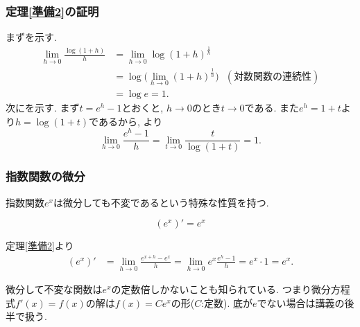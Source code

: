 \begin{frame}
\frametitle{定理\ref{準備2}の証明}

まずを示す. 
\begin{align*} 
\lim_{h \to 0} \frac{\log(1+h)}{h} & = \lim_{h \to 0} \log(1+h)^{\frac{1}{h}} \\
& = \log \big( \lim_{h \to 0} (1+h)^{\frac{1}{h}} \big) \ \ \ (\text{対数関数の連続性})\\
& = \log e = 1. 
\end{align*}
次にを示す. 
まず$t=e^h-1$とおくと, $h\to 0$のとき$t\to0$である. 
また$e^h=1+t$より$h=\log (1+t)$であるから, より
$$
\lim_{h \to 0} \frac{e^h-1}{h}=\lim_{t \to 0} \frac{t}{\log(1+t)}=1. 
$$

\end{frame}




\begin{frame}
\frametitle{指数関数の微分}

 指数関数$e^x$は微分しても不変であるという特殊な性質を持つ. 

\begin{Thm} 
$$(e^x)'=e^x$$
\end{Thm}

定理\ref{準備2}より
\begin{align*} 
(e^x)' &= \lim_{h\to0}\frac{e^{x+h}-e^x}{h}=\lim_{h\to0}e^x \frac{e^h-1}{h}=e^x\cdot 1 = e^x. 
\end{align*}

微分して不変な関数は$e^x$の定数倍しかないことも知られている. 
つまり微分方程式$f'(x)=f(x)$の解は$f(x)=Ce^x$の形($C$:定数). 
底が$e$でない場合は講義の後半で扱う. 

\end{frame}





